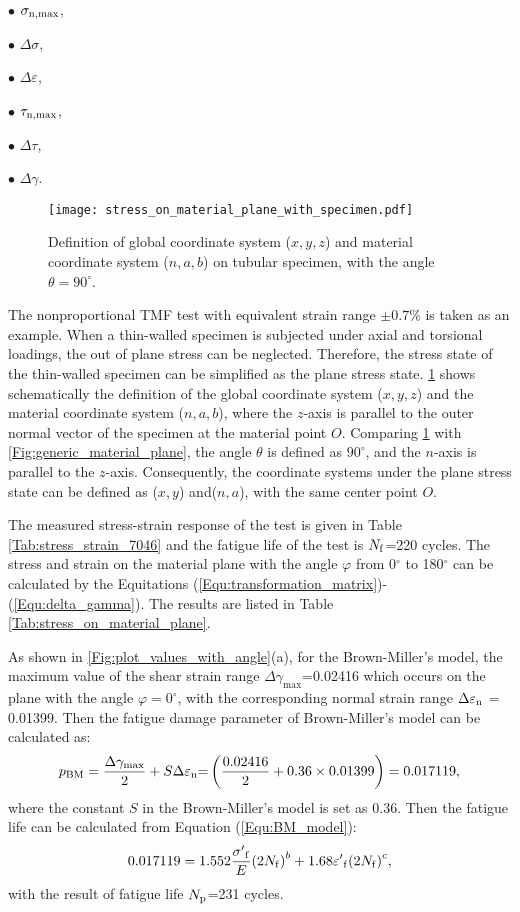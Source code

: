 $\bullet$ $\sigma_{\rm{n,max}}$,

$\bullet$ $\Delta \sigma$,

$\bullet$ $\Delta \varepsilon$,

$\bullet$ $\tau_{\rm{n,max}}$,

$\bullet$ $\Delta \tau$,

$\bullet$ $\Delta \gamma$.

\begin{figure}
\centering
\texttt{[image: stress\_on\_material\_plane\_with\_specimen.pdf]}
\caption{Definition of global coordinate system ($x,y,z$) and material coordinate system ($n,a,b$) on tubular specimen, with the angle $\theta=90^\circ$.}
\label{Fig:stress_on_material_plane_with_specimen}
\end{figure}

The nonproportional TMF test with equivalent strain range $\pm0.7\%$ is taken as an example.
When a thin-walled specimen is subjected under axial and torsional loadings, the out of plane stress can be neglected. Therefore, the stress state of the thin-walled specimen can be simplified as the plane stress state.
\ref {Fig:stress_on_material_plane_with_specimen} shows schematically the definition of the global coordinate system ($x,y,z$) and the material coordinate system ($n,a,b$), where the $z$-axis is parallel to the outer normal vector of the specimen at the material point $O$.
Comparing \ref {Fig:stress_on_material_plane_with_specimen} with \ref{Fig:generic_material_plane}, the angle $\theta$ is defined as $90^\circ$, and the $n$-axis is parallel to the $z$-axis.
Consequently, the coordinate systems under the plane stress state can be defined as ($x,y$) and($n,a$), with the same center point $O$.

The measured stress-strain response of the test is given in Table \ref{Tab:stress_strain_7046} and the fatigue life of the test is $N_{\rm{f}}$=220 cycles. The stress and strain on the material plane with the angle $\varphi$ from 0$^\circ$ to 180$^\circ$ can be calculated by the Equitations (\ref{Equ:transformation_matrix})-(\ref{Equ:delta_gamma}).
The results are listed in Table \ref{Tab:stress_on_material_plane}.

As shown in \ref{Fig:plot_values_with_angle}(a), for the Brown-Miller's model, the maximum value of the shear strain range ${\Delta {\gamma _{\max }}}$=0.02416 which occurs on the plane with the angle $\varphi=0^\circ$, with the corresponding normal strain range $\Delta {\varepsilon _{\rm{n}}}$ = 0.01399. Then the fatigue damage parameter of Brown-Miller's model can be calculated as:
\[{p_{{\rm{BM}}}} = \frac{{\Delta {\gamma _{\max }}}}{2} + S\Delta {\varepsilon _{\rm{n}}}{\rm{ = }}\left( {\frac{{0.02416}}{2} + 0.36 \times 0.01399} \right) = 0.017119,\]
where the constant $S$ in the Brown-Miller's model is set as 0.36.
Then the fatigue life can be calculated from Equation (\ref{Equ:BM_model}):
\[0.017119 = 1.552\frac{{{{\sigma '}_{\rm{f}}}}}{E}{\left( {2{N_{\rm{f}}}} \right)^b} + 1.68{{\varepsilon '}_{\rm{f}}}{\left( {2{N_{\rm{f}}}} \right)^c},\]
with the result of fatigue life $N_{\rm{p}}$=231 cycles.

